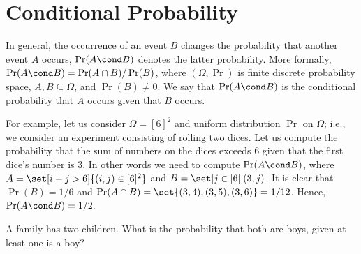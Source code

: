 \chapter{Conditional Probability}
In general, the occurrence of an event $B$ changes the probability that another
event $A$ occurs, $\Pr(A \cond B)$ denotes the latter probability. More
formally, $\Pr(A \cond B) = \Pr(A \cap B) / \Pr(B)$, where $(\Omega, \Pr)$ is
finite discrete probability space, $A, B \subseteq \Omega$, and $\Pr(B) \neq 0$. 
We say that $\Pr(A \cond B)$ is the conditional probability that $A$ occurs
given that $B$ occurs.

For example, let us consider $\Omega = [6]^2$ and uniform distribution $\Pr$ on
$\Omega$; i.e., we consider an experiment consisting of rolling two dices. Let
us compute the probability that the sum of numbers on the dices exceeds $6$
given that the first dice's number is $3$. In other words we need to compute
$\Pr(A \cond B)$, where $A = \set[i + j > 6]{(i, j) \in [6]^2}$ and 
$B = \set[{j \in [6]}]{(3, j)}$. It is clear that $\Pr(B) = 1 / 6$ and 
$\Pr(A \cap B) = \set{(3, 4), (3, 5), (3, 6)} = 1 / 12$. Hence, $\Pr(A \cond B)
= 1 / 2$.

\begin{exercise}
  A family has two children. What is the probability that both are boys, given
  at least one is a boy?
\end{exercise}
